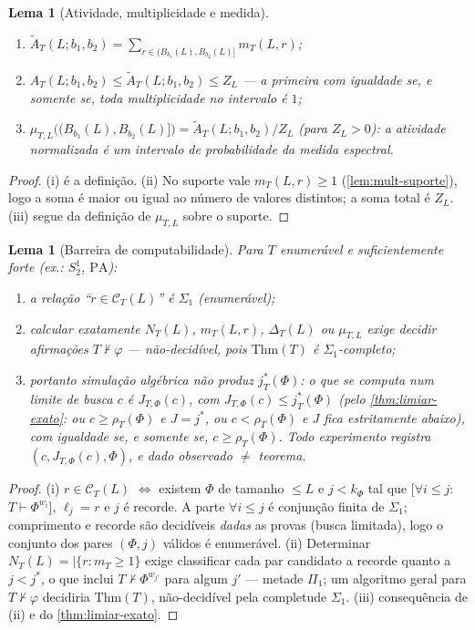 \documentclass[11pt,a4paper]{article}
\newtheorem{lemma}[theorem]{Lema}
\theoremstyle{definition}
\theoremstyle{remark}
\begin{document}
\begin{lemma}[Atividade, multiplicidade e medida]\label{lem:atividade}
\begin{enumerate}
\item[(i)] $\widetilde{A}_T(L;b_1,b_2) = \sum_{r \in (B_{b_1}(L), B_{b_2}(L)]} m_T(L,r)$;
\item[(ii)] $A_T(L;b_1,b_2) \leq \widetilde{A}_T(L;b_1,b_2) \leq Z_L$
  --- a primeira com igualdade se, e somente se, toda multiplicidade
  no intervalo é $1$;
\item[(iii)] $\mu_{T,L}\bigl((B_{b_1}(L), B_{b_2}(L)]\bigr) =
  \widetilde{A}_T(L;b_1,b_2)/Z_L$ (para $Z_L > 0$): a atividade
  normalizada é um intervalo de probabilidade da medida espectral.
\end{enumerate}
\end{lemma}

\begin{proof}
(i) é a definição. (ii) No suporte vale $m_T(L,r) \geq 1$
(\cref{lem:mult-suporte}), logo a soma é maior ou igual ao número de
valores distintos; a soma total é $Z_L$. (iii) segue da definição de
$\mu_{T,L}$ sobre o suporte.
\end{proof}

\begin{lemma}[Barreira de computabilidade]\label{lem:barreira}
Para $T$ enumerável e suficientemente forte (ex.: $S^1_2$, $\mathrm{PA}$):
\begin{enumerate}
\item[(i)] a relação ``$r \in \mathcal{C}_T(L)$'' é $\Sigma_1$
  (enumerável);
\item[(ii)] calcular \emph{exatamente} $N_T(L)$, $m_T(L,r)$,
  $\Delta_T(L)$ ou $\mu_{T,L}$ exige decidir afirmações $T \nvdash
  \varphi$ --- não-decidível, pois $\mathrm{Thm}(T)$ é
  $\Sigma_1$-completo;
\item[(iii)] portanto simulação algébrica não produz $j^{*}_T(\Phi)$:
  o que se computa num limite de busca $c$ é $J_{T,\Phi}(c)$, com
  $J_{T,\Phi}(c) \leq j^{*}_T(\Phi)$ (pelo \cref{thm:limiar-exato}:
  ou $c \geq \rho_T(\Phi)$ e $J = j^{*}$, ou $c < \rho_T(\Phi)$ e $J$
  fica estritamente abaixo), com igualdade se, e somente se, $c \geq
  \rho_T(\Phi)$. Todo experimento registra $(c, J_{T,\Phi}(c), \Phi)$,
  e \emph{dado observado $\neq$ teorema}.
\end{enumerate}
\end{lemma}

\begin{proof}
(i) $r \in \mathcal{C}_T(L)$ $\iff$ existem $\Phi$ de tamanho $\leq L$
e $j < k_\Phi$ tal que [$\forall i \leq j$: $T \vdash \Phi^{w_i}$],
$\ell_j = r$ e $j$ é recorde. A parte $\forall i \leq j$ é conjunção
finita de $\Sigma_1$; comprimento e recorde são decidíveis \emph{dadas}
as provas (busca limitada), logo o conjunto dos pares $(\Phi,j)$
válidos é enumerável. (ii) Determinar $N_T(L) = |\{r : m_T \geq 1\}$
exige classificar cada par candidato a recorde quanto a $j < j^{*}$,
o que inclui $T \nvdash \Phi^{w_{j'}}$ para algum $j'$ --- metade
$\Pi_1$; um algoritmo geral para $T \nvdash \varphi$ decidiria
$\mathrm{Thm}(T)$, não-decidível pela completude $\Sigma_1$. (iii)
consequência de (ii) e do \cref{thm:limiar-exato}.
\end{proof}
\end{document}
